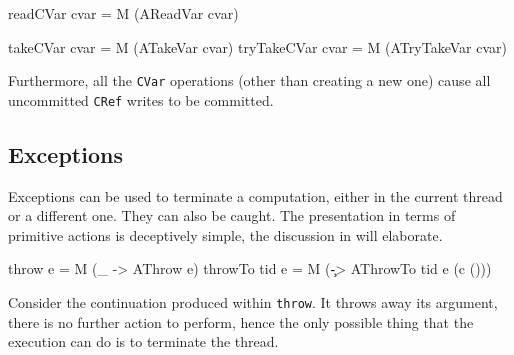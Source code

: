 
\begin{haskellcode}
readCVar cvar = M (AReadVar cvar)
\end{haskellcode}


\begin{haskellcode}
takeCVar    cvar = M (ATakeVar    cvar)
tryTakeCVar cvar = M (ATryTakeVar cvar)
\end{haskellcode}



Furthermore, all the \verb|CVar| operations (other than creating a new
one) cause all uncommitted \verb|CRef| writes to be committed.

\subsection{Exceptions}
\label{sec:execution-primops-exceptions}

Exceptions can be used to terminate a computation, either in the
current thread or a different one. They can also be caught. The
presentation in terms of primitive actions is deceptively simple, the
discussion in  will elaborate.

\begin{haskellcode}
throw       e = M (\_ -> AThrow e)
throwTo tid e = M (\c -> AThrowTo tid e (c ()))
\end{haskellcode}


Consider the continuation produced within \verb|throw|. It throws away
its argument, there is no further action to perform, hence the only
possible thing that the execution can do is to terminate the thread.


